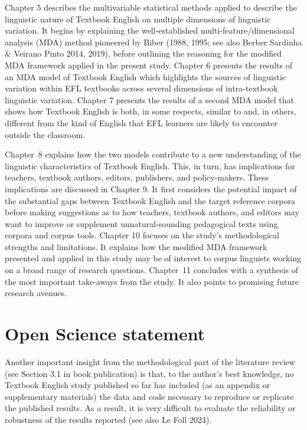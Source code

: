 \documentclass[
  letterpaper,
  DIV=11,
  numbers=noendperiod]{scrreprt}
\begin{document}
Chapter 5 describes the multivariable statistical methods applied to
describe the linguistic nature of Textbook English on multiple
dimensions of linguistic variation. It begins by explaining the
well-established multi-feature/dimensional analysis (MDA) method
pioneered by Biber (1988, 1995; see also Berber Sardinha \& Veirano
Pinto 2014, 2019), before outlining the reasoning for the modified MDA
framework applied in the present study. Chapter 6 presents the results
of an MDA model of Textbook English which highlights the sources of
linguistic variation within EFL textbooks across several dimensions of
intra-textbook linguistic variation. Chapter 7 presents the results of a
second MDA model that shows how Textbook English is both, in some
respects, similar to and, in others, different from the kind of English
that EFL learners are likely to encounter outside the classroom.

Chapter~8 explains how the two models contribute to a new understanding
of the linguistic characteristics of Textbook English. This, in turn,
has implications for teachers, textbook authors, editors, publishers,
and policy-makers. These implications are discussed in Chapter 9. It
first considers the potential impact of the substantial gaps between
Textbook English and the target reference corpora before making
suggestions as to how teachers, textbook authors, and editors may want
to improve or supplement unnatural‑sounding pedagogical texts using
corpora and corpus tools. Chapter 10 focuses on the study's
methodological strengths and limitations. It explains how the modified
MDA framework presented and applied in this study may be of interest to
corpus linguists working on a broad range of research questions.
Chapter~11 concludes with a synthesis of the most important take-aways
from the study. It also points to promising future research avenues.


\chapter{Open Science statement}\label{open-science-statement}

Another important insight from the methodological part of the literature
review (see Section 3.1 in book publication) is that, to the author's
best knowledge, no Textbook English study published so far has included
(as an appendix or supplementary materials) the data and code necessary
to reproduce or replicate the published results. As a result, it is very
difficult to evaluate the reliability or robustness of the results
reported (see also Le Foll 2024).
\end{document}
